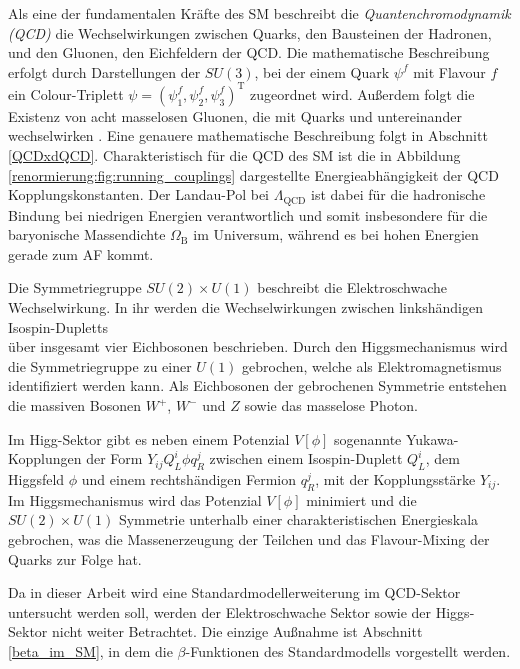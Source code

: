     Als eine der fundamentalen Kräfte des SM beschreibt die 
    \textit{Quantenchromodynamik (QCD)} die Wechselwirkungen 
    zwischen Quarks, den Bausteinen der Hadronen, und den Gluonen, den 
    Eichfeldern der QCD. Die mathematische Beschreibung erfolgt durch 
    Darstellungen der $SU(3)$, bei der einem Quark $\psi^f$ mit Flavour $f$ ein 
    Colour-Triplett $\psi = \left(\psi^f_1, \psi_2^f, \psi_3^f\right)^\text{T}$ 
    zugeordnet wird. 
    Außerdem folgt die Existenz von acht masselosen Gluonen, die mit Quarks und 
    untereinander wechselwirken \cite{Ellis_Webber}. Eine genauere 
    mathematische Beschreibung folgt in Abschnitt \ref{QCDxdQCD}. 
    Charakteristisch für die QCD des SM ist die in Abbildung 
    \ref{renormierung:fig:running_couplings} dargestellte Energieabhängigkeit 
    der QCD Kopplungskonstanten. Der Landau-Pol bei $\Lambda_\text{QCD}$ ist 
    dabei für die hadronische Bindung bei niedrigen Energien verantwortlich 
    und somit insbesondere für die baryonische Massendichte $\Omega_\text{B}$ 
    im Universum, während es bei hohen Energien gerade zum AF kommt.
    
    Die Symmetriegruppe $SU(2)\times U(1)$ beschreibt die Elektroschwache 
    Wechselwirkung. In ihr werden die Wechselwirkungen zwischen  
    linkshändigen Isospin-Dupletts 
    \begin{equation}
      
    \end{equation}
    über insgesamt vier Eichbosonen beschrieben. Durch den Higgsmechanismus 
    wird die Symmetriegruppe zu einer $U(1)$ gebrochen, welche als 
    Elektromagnetismus identifiziert werden kann. Als Eichbosonen der 
    gebrochenen Symmetrie entstehen die massiven Bosonen $W^+$, $W^-$ und $Z$ 
    sowie das masselose Photon.
    
    Im Higg-Sektor gibt es neben einem Potenzial $V[\phi]$ sogenannte 
    Yukawa-Kopplungen der 
    Form $Y_{ij} Q_L^i \phi q_R^j $
    zwischen einem Isospin-Duplett $Q_L^i$, dem Higgsfeld $\phi$ und einem 
    rechtshändigen Fermion $q_R^j$, mit der Kopplungsstärke $Y_{ij}$. Im 
    Higgsmechanismus wird das 
    Potenzial $V[\phi]$ minimiert und die $SU(2)\times U(1)$ Symmetrie 
    unterhalb einer charakteristischen Energieskala gebrochen, was 
    die Massenerzeugung der Teilchen und das Flavour-Mixing der Quarks zur 
    Folge hat. \cite{PDG:Higgs}
    
    Da in dieser Arbeit wird eine Standardmodellerweiterung im QCD-Sektor 
    untersucht werden soll, werden der Elektroschwache Sektor sowie der 
    Higgs-Sektor nicht weiter Betrachtet. Die einzige Außnahme ist Abschnitt 
    \ref{beta_im_SM}, in dem die $\beta$-Funktionen des Standardmodells 
    vorgestellt werden.
    
